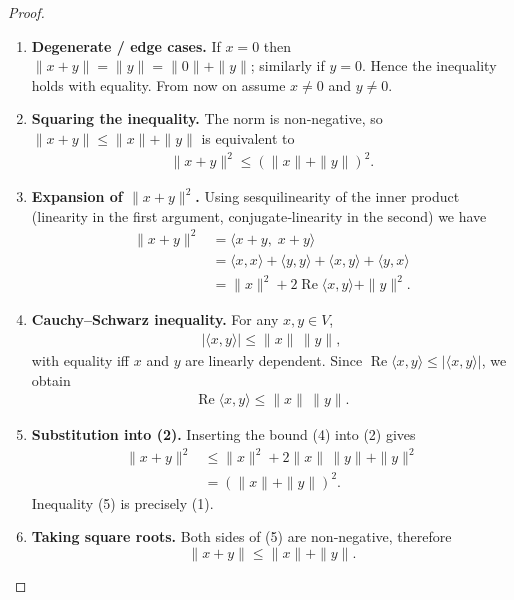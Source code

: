 \begin{proof}
\begin{enumerate}
\item \textbf{Degenerate / edge cases.}  
If $x=0$ then $\|x+y\|=\|y\|=\|0\|+\|y\|$; similarly if $y=0$. Hence the inequality holds with equality. From now on assume $x\neq0$ and $y\neq0$.

\item \textbf{Squaring the inequality.}  
The norm is non‑negative, so $\|x+y\|\le\|x\|+\|y\|$ is equivalent to
\begin{align*}
\|x+y\|^{2}\le(\|x\|+\|y\|)^{2}. \tag{1}
\end{align*}

\item \textbf{Expansion of $\|x+y\|^{2}$.}  
Using sesquilinearity of the inner product (linearity in the first argument, conjugate‑linearity in the second) we have
\begin{align*}
\|x+y\|^{2}
&=\langle x+y,\;x+y\rangle \\[2mm]
&=\langle x,x\rangle+\langle y,y\rangle+\langle x,y\rangle+\langle y,x\rangle \\[2mm]
&=\|x\|^{2}+2\operatorname{Re}\langle x,y\rangle+\|y\|^{2}.
\tag{2}
\end{align*}

\item \textbf{Cauchy–Schwarz inequality.}  
For any $x,y\in V$,
\begin{align*}
|\langle x,y\rangle|\le\|x\|\,\|y\|,
\tag{3}
\end{align*}
with equality iff $x$ and $y$ are linearly dependent. Since $\operatorname{Re}\langle x,y\rangle\le|\langle x,y\rangle|$, we obtain
\begin{align*}
\operatorname{Re}\langle x,y\rangle\le\|x\|\,\|y\|.
\tag{4}
\end{align*}

\item \textbf{Substitution into (2).}  
Inserting the bound (4) into (2) gives
\begin{align*}
\|x+y\|^{2}
&\le\|x\|^{2}+2\|x\|\,\|y\|+\|y\|^{2} \\
&=(\|x\|+\|y\|)^{2}.
\tag{5}
\end{align*}
Inequality (5) is precisely (1).

\item \textbf{Taking square roots.}  
Both sides of (5) are non‑negative, therefore
\[
\|x+y\|\le\|x\|+\|y\|.
\]


\end{enumerate}
\end{proof}
